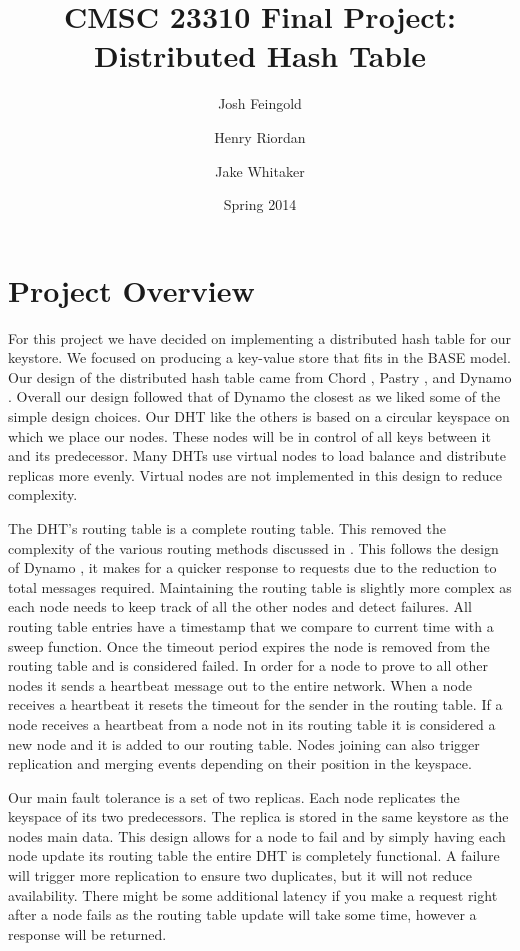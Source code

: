 \documentclass[11pt]{article}
\title{CMSC 23310 Final Project:\\
Distributed Hash Table}
\author{Josh Feingold \and Henry Riordan \and Jake Whitaker}
\date{Spring 2014}
\begin{document}
\maketitle

\section{Project Overview}\label{sec:overview}

For this project we have decided on implementing a distributed hash table for our keystore. We focused on producing a key-value store that fits in the BASE model.\cite{Fox_1997_BASE} Our design of the distributed hash table came from Chord \cite{Stoica_2003_Chord}, Pastry \cite{Rowstron_2001_Pastry}, and Dynamo \cite{DeCandia_2007_Dynamo}. Overall our design followed that of Dynamo the closest as we liked some of the simple design choices. Our DHT like the others is based on a circular keyspace on which we place our nodes. These nodes will be in control of all keys between it and its predecessor. Many DHTs use virtual nodes to load balance and distribute replicas more evenly. Virtual nodes are not implemented in this design to reduce complexity.

The DHT's routing table is a complete routing table. This removed the complexity of the various routing methods discussed in \cite{Stoica_2003_Chord, Rowstron_2001_Pastry}. This follows the design of Dynamo \cite{DeCandia_2007_Dynamo}, it makes for a quicker response to requests due to the reduction to total messages required. Maintaining the routing table is slightly more complex as each node needs to keep track of all the other nodes and detect failures. All routing table entries have a timestamp that we compare to current time with a sweep function. Once the timeout period expires the node is removed from the routing table and is considered failed.  In order for a node to prove to all other nodes it sends a heartbeat message out to the entire network. When a node receives a heartbeat it resets the timeout for the sender in the routing table. If a node receives a heartbeat from a node not in its routing table it is considered a new node and it is added to our routing table. Nodes joining can also trigger replication and merging events depending on their position in the keyspace.

Our main fault tolerance is a set of two replicas. Each node replicates the keyspace of its two predecessors. The replica is stored in the same keystore as the nodes main data. This design allows for a node to fail and by simply having each node update its routing table the entire DHT is completely functional. A failure will trigger more replication to ensure two duplicates, but it will not reduce availability. There might be some additional latency if you make a request right after a node fails as the routing table update will take some time, however a response will be returned.
\end{document}
